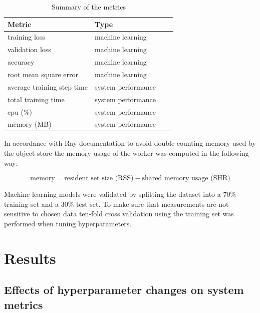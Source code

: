 \begin{table}[h]
    \centering
    \begin{tabular}{llll}
        \toprule
        Metric                     & Type               \\
        \midrule
        training loss              & machine learning   \\
        validation loss            & machine learning   \\
        accuracy                   & machine learning   \\
        root mean square error     & machine learning   \\
        average training step time & system performance \\
        total training time        & system performance \\
        cpu (\%)                   & system performance \\
        memory (MB)                & system performance \\
        \bottomrule
    \end{tabular}
    \caption{Summary of the metrics}
    \label{table:metrics}
\end{table}

In accordance with Ray documentation \parencite{therayteamMemoryManagementRay} to avoid double counting memory used by the object store the memory usage of the worker was computed in the following way:

\[ \text{memory} = \text{resident set size (RSS)} - \text{shared memory usage (SHR)} \]

Machine learning models were validated by splitting the dataset into a $70\%$ training set and a $30\%$ test set. To make sure that measurements are not sensitive to chosen data ten-fold cross validation using the training set was performed when tuning hyperparameters.



\section{Results}

\subsection{Effects of hyperparameter changes on system metrics}


